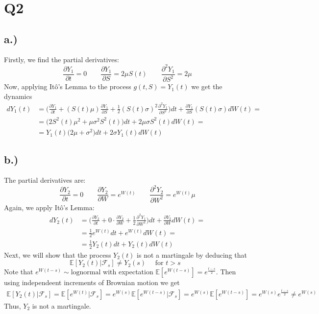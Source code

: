 \documentclass{article}
\begin{document}
\section*{Q2}
\subsection*{a.)}
Firstly, we find the partial derivatives: 
$$ 
\frac{\partial Y_1}{ \partial t} = 0 \quad \quad  \frac{\partial Y_1}{ \partial S} = 2 \mu S(t) \quad \quad  \frac{\partial^2 Y_1}{ \partial S^2} = 2 \mu 
$$
Now, applying Itô's Lemma to the process $g(t, S)=Y_1(t)$ we get the dynamics 
\begin{align}
    dY_1 (t) &= \Big( \frac{\partial Y_1}{ \partial t}  + (S(t) \mu) \frac{\partial Y_1}{ \partial S} + \frac{1}{2} (S(t) \sigma)^2 \frac{\partial^2 Y_1}{ \partial S^2}    \Big)dt +   \frac{\partial Y_1}{ \partial S} (S(t) \sigma) dW(t)= \\
    &=  \Big( 2 S^2(t) \mu^2 + \mu \sigma^2 S^2(t)    \Big)dt + 2 \mu \sigma S^2(t) d W(t) = \\
    &= Y_1(t)\Big( 2 \mu +  \sigma^2     \Big)dt + 2  \sigma Y_1(t) d W(t) 
\end{align}

\subsection*{b.)}
The partial derivatives are:
$$
\frac{\partial Y_2}{ \partial t} = 0 \quad \quad  \frac{\partial Y_2}{ \partial W} = e^{W(t)} \quad \quad  \frac{\partial^2 Y_2}{ \partial W^2} = e^{W(t)} \mu 
$$
Again, we apply Itô's Lemma:
\begin{align}
    dY_2 (t) &=\Big( \frac{\partial Y_2}{ \partial t}  + 0 \cdot \frac{\partial Y_2}{ \partial W} + \frac{1}{2} \frac{\partial^2 Y_1}{ \partial W^2}    \Big)dt +   \frac{\partial Y_2}{ \partial W}  dW(t)= \\
    &=  \frac{1}{2} e^{W(t)} dt + e^{W(t)} dW(t) = \\ 
    & = \frac{1}{2} Y_2(t) dt + Y_2(t)dW(t)
\end{align}
Next, we will show that the process $Y_2(t)$ is not a martingale by deducing that 
$$
\mathbb{E}[Y_2(t) | \mathcal{F}_s ] \neq Y_2(s) \quad \text{ for $t > s$ }
$$
Note that $e^{W(t-s)} \sim \text{lognormal}$ with expectation $\mathbb{E}[e^{W(t-s)}]=e^{\frac{t-s}{2}}$. Then using independeent increments of Brownian motion we get
\begin{align}
   \mathbb{E}[Y_2(t) | \mathcal{F}_s ] =   \mathbb{E}[e^{W(t)} | \mathcal{F}_s ] = e^{W(s)} \mathbb{E}[e^{W(t-s)} | \mathcal{F}_s ] = e^{W(s)} \mathbb{E}[e^{W(t-s)}  ] = e^{W(s)} e^{\frac{t-s}{2}} \neq e^{W(s)}
\end{align}
Thus, $Y_2$ is not a martingale.
\end{document}
